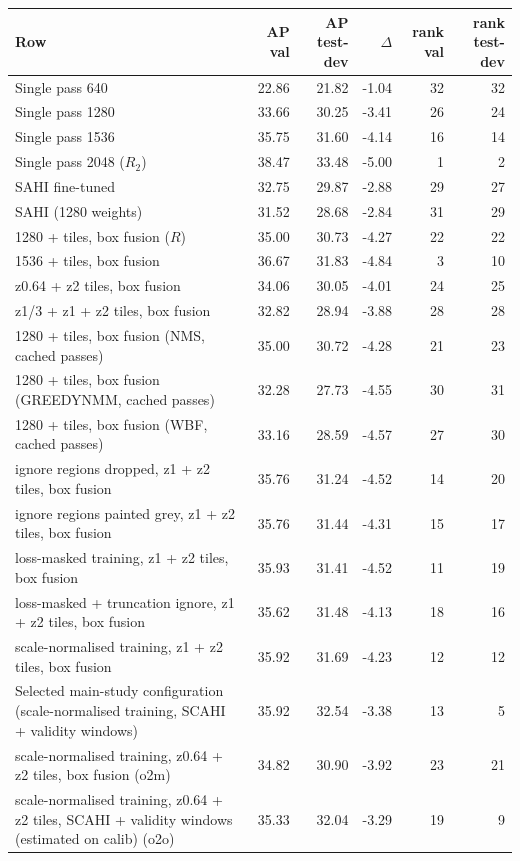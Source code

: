 \begin{tabular}{lrrrrr}
\toprule
Row & AP val & AP test-dev & $\Delta$ & rank val & rank test-dev \\
\midrule
Single pass 640 & 22.86 & 21.82 & -1.04 & 32 & 32 \\
Single pass 1280 & 33.66 & 30.25 & -3.41 & 26 & 24 \\
Single pass 1536 & 35.75 & 31.60 & -4.14 & 16 & 14 \\
Single pass 2048 ($R_2$) & 38.47 & 33.48 & -5.00 & 1 & 2 \\
SAHI fine-tuned & 32.75 & 29.87 & -2.88 & 29 & 27 \\
SAHI (1280 weights) & 31.52 & 28.68 & -2.84 & 31 & 29 \\
1280 + tiles, box fusion ($R$) & 35.00 & 30.73 & -4.27 & 22 & 22 \\
1536 + tiles, box fusion & 36.67 & 31.83 & -4.84 & 3 & 10 \\
z0.64 + z2 tiles, box fusion & 34.06 & 30.05 & -4.01 & 24 & 25 \\
z1/3 + z1 + z2 tiles, box fusion & 32.82 & 28.94 & -3.88 & 28 & 28 \\
1280 + tiles, box fusion (NMS, cached passes) & 35.00 & 30.72 & -4.28 & 21 & 23 \\
1280 + tiles, box fusion (GREEDYNMM, cached passes) & 32.28 & 27.73 & -4.55 & 30 & 31 \\
1280 + tiles, box fusion (WBF, cached passes) & 33.16 & 28.59 & -4.57 & 27 & 30 \\
ignore regions dropped, z1 + z2 tiles, box fusion & 35.76 & 31.24 & -4.52 & 14 & 20 \\
ignore regions painted grey, z1 + z2 tiles, box fusion & 35.76 & 31.44 & -4.31 & 15 & 17 \\
loss-masked training, z1 + z2 tiles, box fusion & 35.93 & 31.41 & -4.52 & 11 & 19 \\
loss-masked + truncation ignore, z1 + z2 tiles, box fusion & 35.62 & 31.48 & -4.13 & 18 & 16 \\
scale-normalised training, z1 + z2 tiles, box fusion & 35.92 & 31.69 & -4.23 & 12 & 12 \\
Selected main-study configuration (scale-normalised training, SCAHI + validity windows) & 35.92 & 32.54 & -3.38 & 13 & 5 \\
scale-normalised training, z0.64 + z2 tiles, box fusion (o2m) & 34.82 & 30.90 & -3.92 & 23 & 21 \\
scale-normalised training, z0.64 + z2 tiles, SCAHI + validity windows (estimated on calib) (o2o) & 35.33 & 32.04 & -3.29 & 19 & 9 \\

\end{tabular}
